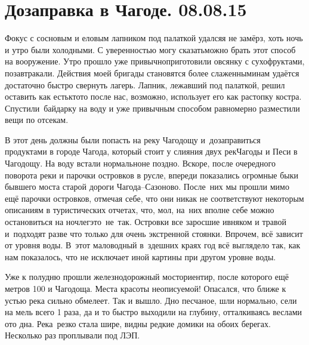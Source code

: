 \chapter{Дозаправка в Чагоде. 08.08.15}

Фокус с сосновым и еловым лапником под палаткой удался\mdash я не замёрз, хоть ночь и утро были холодными. С уверенностью могу сказать\mdash можно брать этот способ на вооружение. Утро прошло уже привычно\mdash приготовили овсянку с сухофруктами, позавтракали. Действия моей бригады становятся более слаженными\mdash нам удаётся достаточно быстро свернуть лагерь. Лапник, лежавший под палаткой, решил оставить как есть\mdash кто\sdash то после нас, возможно, использует его как растопку костра. Спустили~байдарку на воду и уже привычным  способом равномерно разместили вещи по отсекам. 

В этот день должны были попасть на реку Чагодощу и~дозаправиться продуктами в городе Чагода, который стоит у слияния двух рек\mdash Чагоды и Песи в Чагодощу. На воду встали нормально\mdash не поздно. Вскоре, после очередного поворота реки и парочки островков в русле, впереди показались огромные быки бывшего моста старой дороги Чагода\nobreakdash--Сазоново. После~них мы прошли мимо ещё парочки островков, отмечая себе, что они никак не соответствуют некоторым описаниям в туристических отчетах, что, мол, на~них вполне себе можно остановиться на ночлег\mdash это~не~так. Островки все заросшие ивняком и травой и~подходят разве что только для очень экстренной стоянки. Впрочем, всё зависит от уровня воды. В~этот маловодный в~здешних краях год всё выглядело так, как нам показалось, что не исключает иной картины при другом уровне воды. 

Уже к полудню прошли железнодорожный мост\mdash ориентир, после которого ещё метров 100 и Чагодоща. Места красоты неописуемой! Опасался, что ближе к устью река сильно обмелеет. Так и вышло. Дно песчаное, шли нормально, сели на мель всего 1 раза, да и то быстро выходили на глубину, отталкиваясь веслами ото дна. Река~резко стала шире, видны редкие домики на обоих берегах. Несколько раз проплывали под ЛЭП. 

